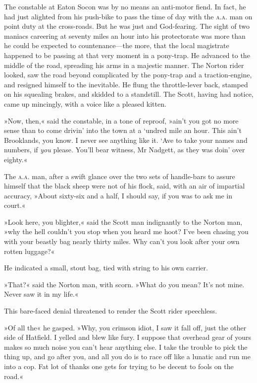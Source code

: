 The constable at Eaton Socon was by no means an anti-motor fiend. In fact, he had just alighted from his push-bike to pass the time of day with the \textsc{a.a.} man on point duty at the cross-roads. But he was just and God-fearing. The sight of two maniacs careering at seventy miles an hour into his protectorate was more than he could be expected to countenance—the more, that the local magistrate happened to be passing at that very moment in a pony-trap. He advanced to the middle of the road, spreading his arms in a majestic manner. The Norton rider looked, saw the road beyond complicated by the pony-trap and a traction-engine, and resigned himself to the inevitable. He flung the throttle-lever back, stamped on his squealing brakes, and skidded to a standstill. The Scott, having had notice, came up mincingly, with a voice like a pleased kitten.

»Now, then,« said the constable, in a tone of reproof, »ain't you got no more sense than to come drivin' into the town at a `undred mile an hour. This ain't Brooklands, you know. I never see anything like it. `Ave to take your names and numbers, if \textit{you} please. You'll bear witness, Mr Nadgett, as they was doin' over eighty.«

The \textsc{a.a.} man, after a swift glance over the two sets of handle-bars to assure himself that the black sheep were not of his flock, said, with an air of impartial accuracy, »About sixty-six and a half, I should say, if you was to ask me in court.«

»Look here, you blighter,« said the Scott man indignantly to the Norton man, »why the hell couldn't you stop when you heard me hoot? I've been chasing you with your beastly bag nearly thirty miles. Why can't you look after your own rotten luggage?«

He indicated a small, stout bag, tied with string to his own carrier.

»That?« said the Norton man, with scorn. »What do you mean? It's not mine. Never saw it in my life.«

This bare-faced denial threatened to render the Scott rider speechless.

»Of all the\longdash« he gasped. »Why, you crimson idiot, I saw it fall off, just the other side of Hatfield. I yelled and blew like fury. I suppose that overhead gear of yours makes so much noise you can't hear anything else. I take the trouble to pick the thing up, and go after you, and all you do is to race off like a lunatic and run me into a cop. Fat lot of thanks one gets for trying to be decent to fools on the road.«


